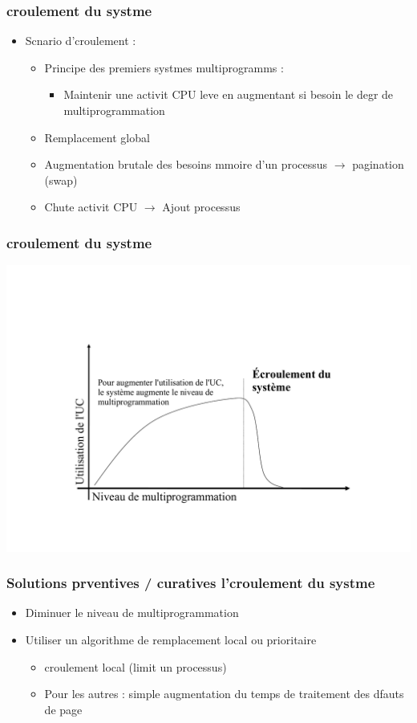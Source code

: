 \begin{frame}
\frametitle{croulement du systme}
\begin{itemize}
\item Scnario d'croulement :
\begin{itemize}
\item Principe des premiers systmes multiprogramms :
\begin{itemize}
\item Maintenir une activit CPU leve en augmentant si besoin le degr de multiprogrammation 
\end{itemize}
\item Remplacement global
\item Augmentation brutale des besoins mmoire d'un processus $\rightarrow$ pagination (swap)
\item Chute activit CPU $\rightarrow$ Ajout processus
\end{itemize}
\end{itemize}
\end{frame}


\begin{frame}
\frametitle{croulement du systme}
\includegraphics[width=.8\textwidth]{../illustration/Ecroulement.pdf}
\end{frame}

\begin{frame}
\frametitle{Solutions prventives / curatives  l'croulement du systme}
\begin{itemize}
\item Diminuer le niveau de multiprogrammation
\item Utiliser un algorithme de remplacement local ou prioritaire
\begin{itemize}
\item croulement local (limit  un processus)
\item Pour les autres : simple augmentation du temps de traitement des dfauts de page
\end{itemize}
\end{itemize}
\end{frame}


